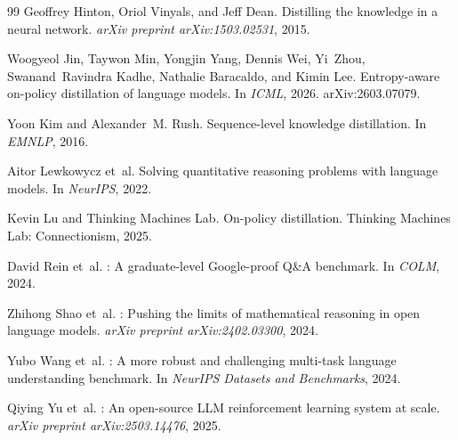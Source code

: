 \documentclass[11pt]{article}
\theoremstyle{definition}
\theoremstyle{remark}
\begin{document}
\begin{thebibliography}{99}
Geoffrey Hinton, Oriol Vinyals, and Jeff Dean.
\newblock Distilling the knowledge in a neural network.
\newblock \emph{arXiv preprint arXiv:1503.02531}, 2015.

Woogyeol Jin, Taywon Min, Yongjin Yang, Dennis Wei, Yi~Zhou, Swanand~Ravindra Kadhe, Nathalie Baracaldo, and Kimin Lee.
\newblock Entropy-aware on-policy distillation of language models.
\newblock In \emph{ICML}, 2026. arXiv:2603.07079.

Yoon Kim and Alexander~M. Rush.
\newblock Sequence-level knowledge distillation.
\newblock In \emph{EMNLP}, 2016.

Aitor Lewkowycz et~al.
\newblock Solving quantitative reasoning problems with language models.
\newblock In \emph{NeurIPS}, 2022.

Kevin Lu and {Thinking Machines Lab}.
\newblock On-policy distillation.
\newblock Thinking Machines Lab: Connectionism, 2025.

David Rein et~al.
: A graduate-level {Google}-proof {Q\&A} benchmark.
\newblock In \emph{COLM}, 2024.

Zhihong Shao et~al.
: Pushing the limits of mathematical reasoning in open language models.
\newblock \emph{arXiv preprint arXiv:2402.03300}, 2024.

Yubo Wang et~al.
: A more robust and challenging multi-task language understanding benchmark.
\newblock In \emph{NeurIPS Datasets and Benchmarks}, 2024.

Qiying Yu et~al.
: An open-source {LLM} reinforcement learning system at scale.
\newblock \emph{arXiv preprint arXiv:2503.14476}, 2025.

\end{thebibliography}
\end{document}
